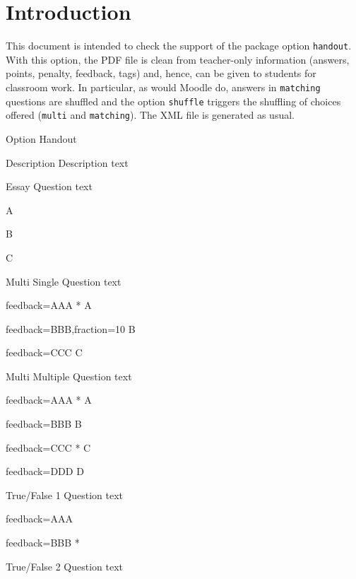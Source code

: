 \documentclass{article}
\begin{document}
\section*{Introduction}

This document is intended to check the support of the package option 
\texttt{handout}. With this option, the PDF file is clean from teacher-only 
information (answers, points, penalty, feedback, tags) and, hence, can be given 
to students for classroom work. In particular, as would Moodle do, 
answers in \texttt{matching} questions are shuffled and the option 
\texttt{shuffle} triggers the shuffling of choices offered (\texttt{multi} and 
\texttt{matching}). The XML file is generated as usual.

\begin{quiz}[points=1,tags={tag},feedback={General feedback},shuffle]{ Option 
Handout}

\begin{description}{Description}
Description text
\end{description}

\begin{essay}{Essay}
Question text
\item A
\item B
\item C
\end{essay}

\begin{multi}[shuffle=false]{Multi Single}
Question text
\item[feedback={AAA}]* A
\item[feedback={BBB},fraction=10] B
\item[feedback={CCC}] C
\end{multi}

\begin{multi}[multiple]{Multi Multiple}
Question text
\item[feedback={AAA}]* A
\item[feedback={BBB}] B
\item[feedback={CCC}]* C
\item[feedback={DDD}] D
\end{multi}

\begin{truefalse}{True/False 1}
Question text
\item[feedback={AAA}]
\item[feedback={BBB}]*
\end{truefalse}

\begin{truefalse}{True/False 2}
Question text
\item*
\end{truefalse}


\end{quiz}
\end{document}
